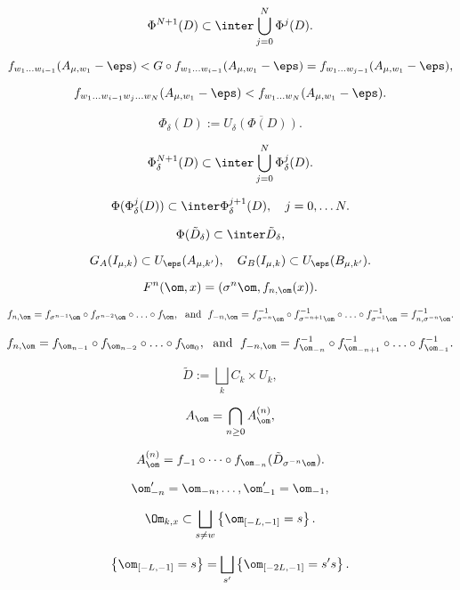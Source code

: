 \documentclass[a4paper,12pt]{article}
\begin{document}
\begin{equation}\label{eq:N+1}
\Phi^{N+1}(D) \subset \inter \bigcup_{j=0}^N \Phi^j(D).
\end{equation}

$$
f_{w_1\dots w_{i-1}}(A_{\mu,w_1}-\eps)< G\circ f_{w_1\dots w_{i-1}}(A_{\mu,w_1}-\eps)  = f_{w_1\dots w_{j-1}}(A_{\mu,w_1}-\eps),
$$

$$
f_{w_1\dots w_{i-1}w_j\dots w_N}(A_{\mu,w_1}-\eps)<f_{w_1\dots w_{N}}(A_{\mu,w_1}-\eps).
$$

$$
\Phi_\delta (D) := \overline{U_\delta (\Phi(D))}.
$$

\begin{equation}\label{eq:delta}
\Phi_{\delta}^{N+1}(D) \subset 
\inter \bigcup_{j=0}^N \Phi_{\delta}^j(D).
\end{equation}

$$
\Phi(\Phi_{\delta}^{j}(D))\subset \inter \Phi_{\delta}^{j+1}(D), \quad j=0,\dots N.
$$

$$
\Phi(\tilde{D}_{\delta}) \subset \inter \tilde{D}_\delta,
$$

$$
G_A (I_{\mu,k}) \subset U_\eps (A_{\mu,k'}), \quad G_B (I_{\mu,k}) \subset U_\eps (B_{\mu,k'}).
$$

\begin{equation}    \label{e:n_image}
F^n(\om,x) = (\sigma^n \om, f_{n,\om} (x)).
\end{equation}

$$
f_{n,\om} = f_{\sigma^{n-1}\om} \circ f_{\sigma^{n-2}\om} \circ \ldots \circ f_{\om},\;\text{ and }\;
f_{-n,\om} = f_{\sigma^{-n}\om}^{-1} \circ f_{\sigma^{-n+1}\om}^{-1} \circ \ldots \circ f_{\sigma^{-1}\om}^{-1} = f^{-1}_{n,\sigma^{-n}\om}.
$$

$$
f_{n,\om} = f_{\om_{n-1}} \circ f_{\om_{n-2}} \circ \ldots \circ f_{\om_0},\;\text{ and }\;
f_{-n,\om} = f_{\om_{-n}}^{-1} \circ f_{\om_{-n+1}}^{-1} \circ \ldots \circ f_{\om_{-1}}^{-1}.
$$

$$
\tilde D := \bigsqcup_k C_k \times U_k,
$$

$$
A_\om = \bigcap_{n \ge 0} A_\om^{(n)},
$$

$$
A_\om^{(n)} = f_{-1} \circ \dots \circ f_{\om_{-n}} (\tilde D_{\sigma^{-n} \om}).
$$

$$
\om_{-n}' = \om_{-n}, \dots, \om_{-1}' = \om_{-1},
$$

$$
\Om_{k,x} \subset \bigsqcup_{s \ne w} \left\{ \om_{[-L,-1]} = s \right\}.
$$

$$
\left\{ \om_{[-L,-1]} = s \right\} = \bigsqcup_{s'} \left\{ \om_{[-2L,-1]} = s's \right\}.
$$
\end{document}

